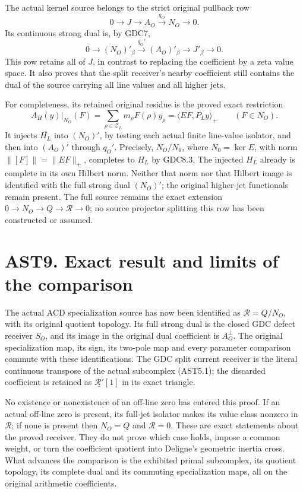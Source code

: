 The actual kernel source belongs to the strict original pullback row \[
0\to J\to A_O\xrightarrow{q_O}N_O\to0.
\tag{AST8.1}
\] Its continuous strong dual is, by GDC7, \[
0\to(N_O)'_\beta\xrightarrow{q_O'}(A_O)'_\beta
\to J'_\beta\to0.
\tag{AST8.2}
\] This row retains all of \(J\), in contrast to replacing the
coefficient by a zeta value space. It also proves that the split
receiver's nearby coefficient still contains the dual of the source
carrying all line values and all higher jets.

For completeness, its retained original residue is the proved exact
restriction \[
A_H(y)|_{N_O}(F)
=\sum_{\rho\in\mathscr Z_L}m_\rho F(\rho)\overline{y_\rho}
=\langle EF,P_Ly\rangle_+\qquad(F\in N_O).
\tag{AST8.3}
\] It injects \(\overline{H_L}\) into \((N_O)'\), by testing each actual
finite line-value isolator, and then into \((A_O)'\) through \(q_O'\).
Precisely, \(N_O/N_0\), where \(N_0=\ker E\), with norm
\(\|[F]\|=\|EF\|_+\), completes to \(H_L\) by GDC8.3. The injected
\(H_L\) already is complete in its own Hilbert norm. Neither that norm
nor that Hilbert image is identified with the full strong dual
\((N_O)'\); the original higher-jet functionals remain present. The full
source remains the exact extension \(0\to N_O\to Q\to\mathcal R\to0\);
no source projector splitting this row has been constructed or assumed.

\section{AST9. Exact result and limits of the
comparison}\label{ast9.-exact-result-and-limits-of-the-comparison}

The actual ACD specialization source has now been identified as
\(\mathcal R=Q/N_O\), with its original quotient topology. Its full
strong dual is the closed GDC defect receiver \(S_O\), and its image in
the original dual coefficient is \(A_O^\perp\). The original
specialization map, its sign, its two-pole map and every parameter
comparison commute with these identifications. The GDC split current
receiver is the literal continuous transpose of the actual subcomplex
(AST5.1); the discarded coefficient is retained as
\(\underline{\mathcal R'}[1]\) in its exact triangle.

No existence or nonexistence of an off-line zero has entered this proof.
If an actual off-line zero is present, its full-jet isolator makes its
value class nonzero in \(\mathcal R\); if none is present then \(N_O=Q\)
and \(\mathcal R=0\). These are exact statements about the proved
receiver. They do not prove which case holds, impose a common weight, or
turn the coefficient quotient into Deligne's geometric inertia cross.
What advances the comparison is the exhibited primal subcomplex, its
quotient topology, its complete dual and its commuting specialization
maps, all on the original arithmetic coefficients.

